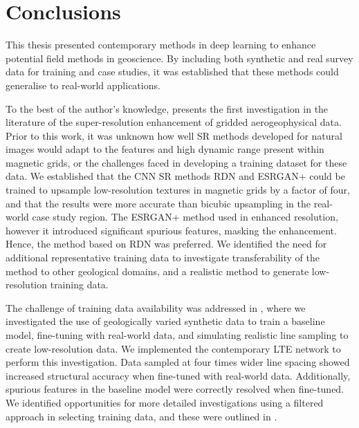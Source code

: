 
\chapter{Conclusions}
\label{ch:conclusions}
This thesis presented contemporary methods in deep learning to enhance potential field methods in geoscience.
By including both synthetic and real survey data for training and case studies, it was established that these methods could generalise to real-world applications.

To the best of the author's knowledge,  presents the first investigation in the literature of the super-resolution enhancement of gridded aerogeophysical data.
Prior to this work, it was unknown how well SR methods developed for natural images would adapt to the features and high dynamic range present within magnetic grids, or the challenges faced in developing a training dataset for these data.
We established that the CNN SR methods RDN\textdaggerdbl{} and ESRGAN+ could be trained to upsample low-resolution textures in magnetic grids by a factor of four, and that the results were more accurate than bicubic upsampling in the real-world case study region.
The ESRGAN+ method used in  enhanced resolution, however it introduced significant spurious features, masking the enhancement.
Hence, the method based on RDN\textdaggerdbl{} was preferred.
We identified the need for additional representative training data to investigate transferability of the method to other geological domains, and a realistic method to generate low-resolution training data.

The challenge of training data availability was addressed in , where we investigated the use of geologically varied synthetic data to train a baseline model, fine-tuning with real-world data, and simulating realistic line sampling to create low-resolution data.
We implemented the contemporary LTE network to perform this investigation.
Data sampled at four times wider line spacing showed increased structural accuracy when fine-tuned with real-world data.
Additionally, spurious features in the baseline model were correctly resolved when fine-tuned.
We identified opportunities for more detailed investigations using a filtered approach in selecting training data, and these were outlined in .

